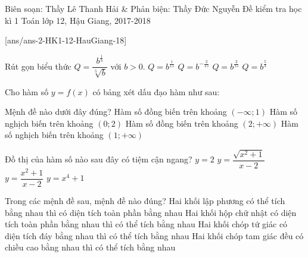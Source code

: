 \begin{name}
		{Biên soạn: Thầy Lê Thanh Hải \& Phản biện: Thầy Đức Nguyễn}
		{Đề kiểm tra học kì 1 Toán lớp 12, Hậu Giang, 2017-2018 }
	\end{name}
	\setcounter{ex}{0}\setcounter{bt}{0}
	[ans/ans-2-HK1-12-HauGiang-18]

\begin{ex}%
	Rút gọn biểu thức $Q=\dfrac{b^{\frac{1}{3}}}{\sqrt[5]{b}}$ với $b>0$.
	\choice
	{$Q=b^{\frac{1}{15}}$}
	{$Q=b^{-\frac{2}{15}}$}
	{\True $Q=b^{\frac{2}{15}}$}
	{$Q=b^{\frac{5}{3}}$}
\end{ex}
\begin{ex}%
	Cho hàm số $y=f(x)$ có bảng xét dấu đạo hàm như sau:
	\begin{center}
	\end{center}
	Mệnh đề nào dưới đây đúng?
	\choice
	{Hàm số đồng biến trên khoảng $(-\infty;1)$}
	{Hàm số nghịch biến trên khoảng $(0;2)$}
	{\True Hàm số đồng biến trên khoảng $(2;+\infty)$}
	{Hàm số nghịch biến trên khoảng $(1;+\infty)$}
	
\end{ex}
\begin{ex}%
	Đồ thị của hàm số nào sau đây có tiệm cận ngang?
	\choice
	{$y=2$}
	{\True $y=\dfrac{\sqrt{x^2+1}}{x-2}$}
	{$y=\dfrac{x^2+1}{x-2}$}
	{$y=x^4+1$}
\end{ex}
\begin{ex}%
	Trong các mệnh đề sau, mệnh đề nào đúng?
	\choice
	{\True Hai khối lập phương có thể tích bằng nhau thì có diện tích toàn phần bằng nhau}
	{Hai khối hộp chữ nhật có diện tích toàn phần bằng nhau thì có thể tích bằng nhau}
	{Hai khối chóp tứ giác có diện tích đáy bằng nhau thì có thể tích bằng nhau}
	{Hai khối chóp tam giác đều có chiều cao bằng nhau thì có thể tích bằng nhau}
\end{ex}
